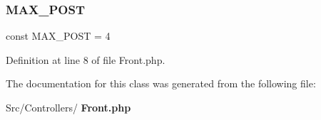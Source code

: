 \subsubsection{M\+A\+X\+\_\+\+P\+O\+ST}
{\footnotesize\ttfamily const M\+A\+X\+\_\+\+P\+O\+ST = 4}



Definition at line 8 of file Front.\+php.



The documentation for this class was generated from the following file\+:\begin{DoxyCompactItemize}
\item 
Src/\+Controllers/\textbf{ Front.\+php}\end{DoxyCompactItemize}
